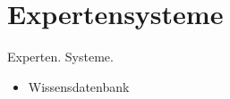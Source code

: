 \chapter{Expertensysteme}
\label{chap:experten_systeme}

Experten. Systeme.
\begin{itemize}
\item Wissensdatenbank
\end{itemize}


